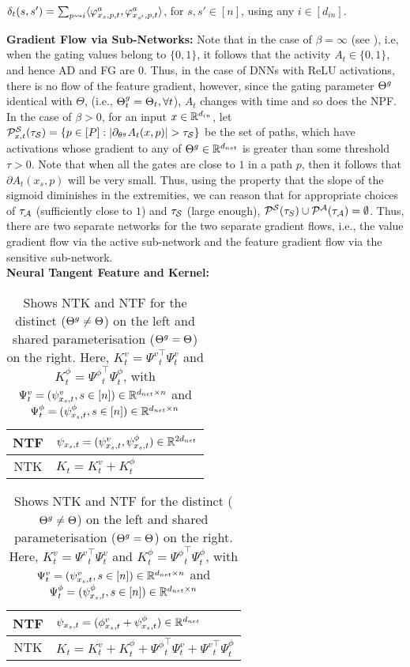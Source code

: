 \begin{definition}\label{def:delta}
$\delta_t(s,s')=\sum_{p\rsa i} \ip{\varphi^a_{x_s,p,t},\varphi^a_{x_{s'},p,t}}$, for $s,s'\in[n]$, using any $i\in[d_{in}]$.
\end{definition}
\textbf{Gradient Flow via Sub-Networks:} Note that in the case of $\beta=\infty$ (see ), i.e, when the gating values belong to $\{0,1\}$, it follows that the activity $A_t\in\{0,1\}$, and hence AD and FG are $0$. Thus, in the case of DNNs with ReLU activations, there is no flow of the feature gradient, however, since the gating parameter $\Tg$ identical with $\Theta$, (i.e., $\Tg_t=\Theta_t,\forall t$), $A_t$ changes with time and so does the NPF. In the case of $\beta>0$, for an input $x\in\R^{d_{in}}$, let $\P^{\S}_{x,t}(\tau_{\S})=\{p\in[P]: |\partial_{\tg} A_t(x,p)|>\tau_{\S}\}$ be the set of paths, which have activations whose gradient to any of $\Tg\inrdnet$ is greater than some threshold $\tau>0$. Note that when all the gates are close to $1$ in a path $p$, then it follows that $\partial A_t(x_s,p)$ will be very small. Thus, using the property that the slope of the sigmoid diminishes in the extremities, we can reason that for appropriate choices of $\tau_{\A}$ (sufficiently close to $1$) and $\tau_{\S}$ (large enough), $\P^{\S}(\tau_{S})\cup \P^{\A}(\tau_{\A})=\emptyset$. Thus, there are two separate networks for the two separate gradient flows, i.e., the value gradient flow via the active sub-network and the feature gradient flow via the sensitive sub-network.\\
\textbf{Neural Tangent Feature and Kernel:}
\FloatBarrier
\begin{table}[h]
\begin{minipage}{0.5\columnwidth}
\begin{tabular}{|c|l|}\hline								 								 													
NTF		&$\psi_{x_s,t}=(\psi^v_{x_s,t},\psi^{\phi}_{x_s,t})\in\R^{2d_{net}}$\\\hline
NTK 		&$K_t=K^v_t+K^{\phi}_t$\\\hline
\end{tabular}
\end{minipage}
\begin{minipage}{0.5\columnwidth}
\begin{tabular}{|c|l|}\hline								 								 													
NTF		&$\psi_{x_s,t}=(\phi^v_{x_s,t}+\psi^{\phi}_{x_s,t})\in\R^{d_{net}}$\\\hline
NTK 		&$K_t=K^v_t+K^{\phi}_t+{\Psi^{\phi}}^\top_t\Psi^v_t+ {\Psi^{v}}^\top_t\Psi^{\phi}_t$\\\hline
\end{tabular}
\end{minipage}
\caption{Shows NTK and NTF for the distinct ($\Tg\neq\Theta$) on the left and shared parameterisation ($\Tg=\Theta$) on the right. Here, $K^v_t={\Psi^{v}}^\top_t\Psi^v_t$ and $K^{\phi}_t={\Psi^{\phi}}^\top_t\Psi^{\phi}_t$, with $\Psi^v_t=(\psi^v_{x_s,t},s\in[n])\in\R^{d_{net}\times n}$ and $\Psi^{\phi}_t=(\psi^{\phi}_{x_s,t},s\in[n])\in\R^{d_{net}\times n}$}
\label{tb:terms}
\end{table}

